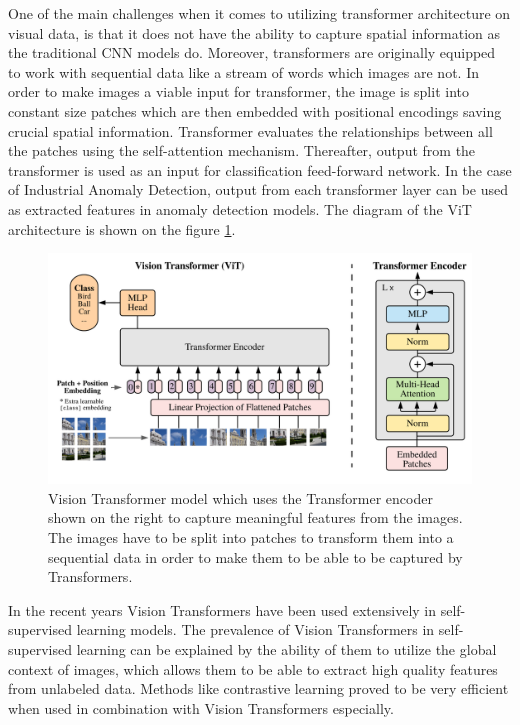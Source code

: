 One of the main challenges when it comes to utilizing transformer architecture on visual data, is that it does not have the ability to capture spatial information as the traditional CNN\cite{lenet} models do. Moreover, transformers are originally equipped to work with sequential data like a stream of words\cite{transformer} which images are not. In order to make images a viable input for transformer, the image is split into constant size patches which are then embedded with positional encodings saving crucial spatial information\cite{vit}. Transformer evaluates the relationships between all the patches using the self-attention mechanism\cite{transformer}. Thereafter, output from the transformer is used as an input for classification feed-forward network\cite{vit}. In the case of Industrial Anomaly Detection\cite{iad_survey}, output from each transformer layer can be used as extracted features in anomaly detection models\cite{pre_trained_iad}. The diagram of the ViT architecture is shown on the figure \ref{fig:vit}.

\begin{figure}[t]
	\begin{center}
		\includegraphics[width=0.8\linewidth]{Chapter_2/vit.png}
	\end{center}
	\caption{Vision Transformer model which uses the Transformer encoder shown on the right to capture meaningful features from the images. The images have to be split into patches to transform them into a sequential data in order to make them to be able to be captured by Transformers\cite{transformer}. \cite{vit}}
	\label{fig:vit}
\end{figure}

In the recent years Vision Transformers have been used extensively in self-supervised learning models\cite{dino}\cite{self_supervised_survey}. The prevalence of Vision Transformers in self-supervised learning can be explained by the ability of them to utilize the global context of images, which allows them to be able to extract high quality features from unlabeled data\cite{vit}. Methods like contrastive learning proved\cite{contrastive} to be very efficient when used in combination with Vision Transformers\cite{vit_contrastive} especially.

